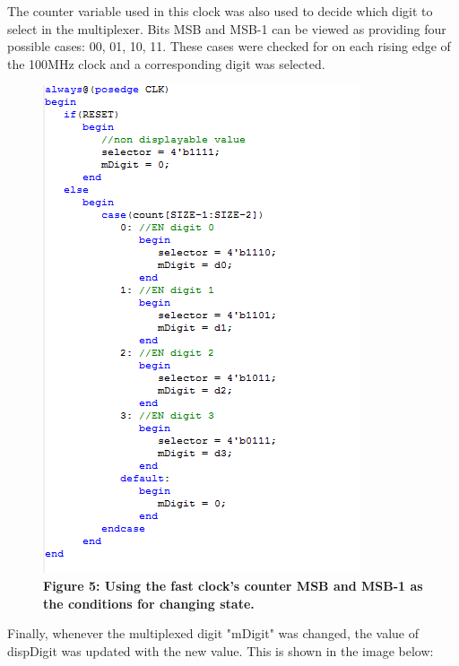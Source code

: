 \documentclass[journal]{IEEEtran}
\begin{document}
The counter variable used in this clock was also used to decide which digit to select in the multiplexer. Bits MSB and MSB-1 can be viewed as providing four possible cases: 00, 01, 10, 11. These cases were checked for on each rising edge of the 100MHz clock and a corresponding digit was selected.
\begin{figure}[H]
	\centering\includegraphics[scale=0.6]{counterchk}
	\caption{\textbf{Figure 5: Using the fast clock's counter MSB and MSB-1 as the conditions for changing state.}}
\end{figure}
Finally, whenever the multiplexed digit "mDigit" was changed, the value of dispDigit was updated with the new value. This is shown in the image below:
\end{document}
